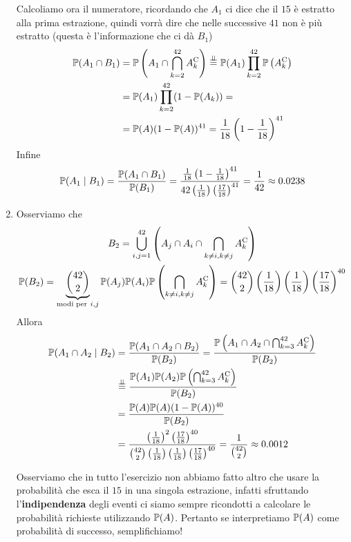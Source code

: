 \begin{enumerate}
	Calcoliamo ora il numeratore, ricordando che $A_{1}$ ci dice che il $15$ è estratto alla prima estrazione, quindi vorrà dire che nelle successive $41$ non è più estratto (questa è l'informazione che ci dà $B_{1}$)
	\begin{align*}
		\mathbb{P}(A_{1} \cap B_{1}) & =\mathbb{P}\left(A_{1} \cap \bigcap_{k=2}^{42} A_{k}^{\mathrm{C}}\right)\overset{\perp \!\!\! \perp }{=}\mathbb{P}(A_{1})\prod_{k=2}^{42}\mathbb{P}\left(A_{k}^{\mathrm{C}}\right)\\
		 & =\mathbb{P}(A_{1})\prod_{k=2}^{42}(1-\mathbb{P}(A_{k})) =\\
		 & =\mathbb{P}(A)(1-\mathbb{P}(A))^{41} =\frac{1}{18}\left(1-\frac{1}{18}\right)^{41}
	\end{align*}
	Infine
	\begin{equation*}
		\mathbb{P}(A_{1} \mid B_{1}) =\frac{\mathbb{P}(A_{1} \cap B_{1})}{\mathbb{P}(B_{1})} =\frac{\frac{1}{18}\left(1-\frac{1}{18}\right)^{41}}{42\left(\frac{1}{18}\right)\left(\frac{17}{18}\right)^{41}} =\frac{1}{42} \approx 0.0238
	\end{equation*}
	\item Osserviamo che
	\begin{gather*}
		B_{2} =\bigcup_{i,j=1}^{42}\left(A_{j} \cap A_{i} \cap \bigcap_{k\neq i,k\neq j} A_{k}\complementary\right)\\
		\PP(B_{2}) =\underbrace{\binom{42}{2}}_{\text{modi per} \ i,j}\PP(A_{j})\PP(A_{i})\PP\left(\bigcap_{k\neq i,k\neq j} A_{k}\complementary\right) =\binom{42}{2}\left(\frac{1}{18}\right)\left(\frac{1}{18}\right)\left(\frac{17}{18}\right)^{40}
	\end{gather*}
	Allora
	\begin{align*}
		\mathbb{P}(A_{1} \cap A_{2} \mid B_{2}) & =\frac{\mathbb{P}(A_{1} \cap A_{2} \cap B_{2})}{\mathbb{P}(B_{2})} =\frac{\mathbb{P}\left(A_{1} \cap A_{2} \cap \bigcap_{k=3}^{42} A_{k}^{\mathrm{C}}\right)}{\mathbb{P}(B_{2})}\\
		 & \overset{\perp \!\!\! \perp }{=}\frac{\mathbb{P}(A_{1})\mathbb{P}(A_{2})\mathbb{P}\left(\bigcap_{k=3}^{42} A_{k}^{\mathrm{C}}\right)}{\mathbb{P}(B_{2})}\\
		 & =\frac{\mathbb{P}(A)\mathbb{P}(A)(1-\mathbb{P}(A))^{40}}{\mathbb{P}(B_{2})}\\
		 & =\frac{\left(\frac{1}{18}\right)^{2}\left(\frac{17}{18}\right)^{40}}{\binom{42}{2}\left(\frac{1}{18}\right)\left(\frac{1}{18}\right)\left(\frac{17}{18}\right)^{40}} =\frac{1}{\binom{42}{2}} \approx 0.0012
	\end{align*}

	\begin{oss}
		Osserviamo che in tutto l'esercizio non abbiamo fatto altro che usare la probabilità che esca il $15$ in una singola estrazione, infatti sfruttando l'\textbf{indipendenza} degli eventi ci siamo sempre ricondotti a calcolare le probabilità richieste utilizzando $\mathbb{P}(A)$. Pertanto se interpretiamo $\mathbb{P}(A)$ come probabilità di successo, semplifichiamo!
	\end{oss}


\end{enumerate}
